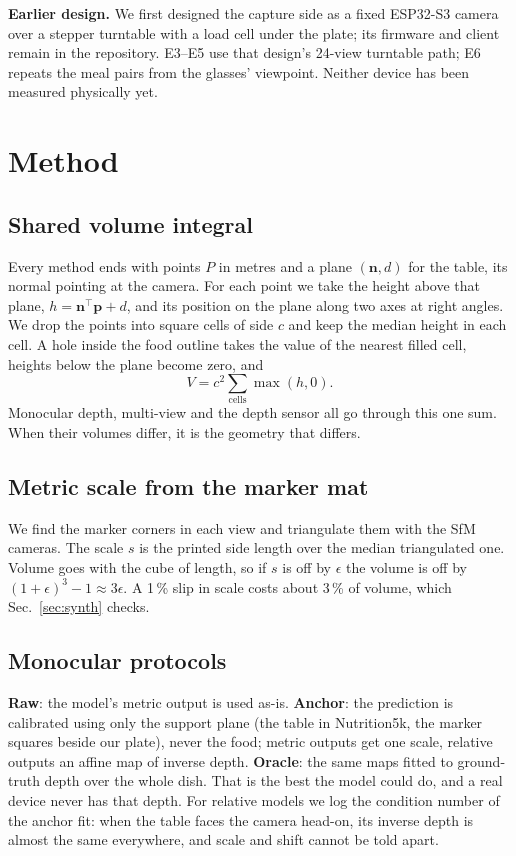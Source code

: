 \documentclass[conference]{IEEEtran}
\begin{document}
\textbf{Earlier design.} We first designed the capture side as a fixed ESP32-S3
camera over a stepper turntable with a load cell under the plate; its firmware
and client remain in the repository. E3--E5 use that design's 24-view
turntable path; E6 repeats the meal pairs from the glasses' viewpoint. Neither
device has been measured physically yet.

\section{Method}
\subsection{Shared volume integral}
Every method ends with points $P$ in metres and a plane $(\mathbf n, d)$ for
the table, its normal pointing at the camera. For each point we take the height
above that plane, $h=\mathbf n^\top\mathbf p+d$, and its position on the plane
along two axes at right angles. We drop the points into square cells of side
$c$ and keep the median height in each cell. A hole inside the food outline
takes the value of the nearest filled cell, heights below the plane become
zero, and
\begin{equation}\label{eq:vol}
V=c^2\sum_{\text{cells}}\max(h,0).
\end{equation}
Monocular depth, multi-view and the depth sensor all go through this one sum.
When their volumes differ, it is the geometry that differs.

\subsection{Metric scale from the marker mat}\label{sec:scale}
We find the marker corners in each view and triangulate them with the SfM
cameras. The scale $s$ is the printed side length over the median triangulated
one. Volume goes with the cube of length, so if $s$ is off by $\epsilon$ the
volume is off by $(1+\epsilon)^3-1\approx3\epsilon$. A 1\,\% slip in scale
costs about 3\,\% of volume, which Sec.~\ref{sec:synth} checks.

\subsection{Monocular protocols}\label{sec:anchor}
\textbf{Raw}: the model's metric output is used as-is. \textbf{Anchor}: the
prediction is calibrated using only the support plane (the table in
Nutrition5k, the marker squares beside our plate), never the food; metric outputs get one
scale, relative outputs an affine map of inverse depth. \textbf{Oracle}: the
same maps fitted to ground-truth depth over the whole dish. That is the best
the model could do, and a real device never has that depth. For relative
models we log the condition number of the anchor fit: when the table faces the
camera head-on, its inverse depth is almost the same everywhere, and scale and
shift cannot be told apart.
\end{document}
